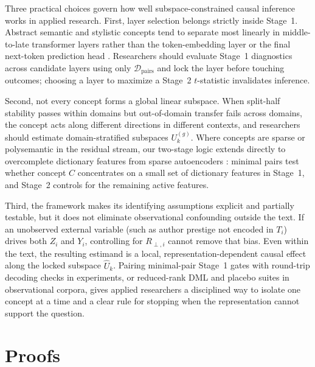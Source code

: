 \documentclass[11pt]{article}
\begin{document}
Three practical choices govern how well subspace-constrained causal inference works in applied research. First, layer selection belongs strictly inside Stage~1. Abstract semantic and stylistic concepts tend to separate most linearly in middle-to-late transformer layers rather than the token-embedding layer or the final next-token prediction head \citep{alain2016understanding,zou2023representation}. Researchers should evaluate Stage~1 diagnostics across candidate layers using only $\mathcal{D}_{\mathrm{pairs}}$ and lock the layer before touching outcomes; choosing a layer to maximize a Stage~2 $t$-statistic invalidates inference.

Second, not every concept forms a global linear subspace. When split-half stability passes within domains but out-of-domain transfer fails across domains, the concept acts along different directions in different contexts, and researchers should estimate domain-stratified subspaces $U_k^{(g)}$. Where concepts are sparse or polysemantic in the residual stream, our two-stage logic extends directly to overcomplete dictionary features from sparse autoencoders \citep{cunningham2023sparse}: minimal pairs test whether concept $C$ concentrates on a small set of dictionary features in Stage~1, and Stage~2 controls for the remaining active features.

Third, the framework makes its identifying assumptions explicit and partially testable, but it does not eliminate observational confounding outside the text. If an unobserved external variable (such as author prestige not encoded in $T_i$) drives both $Z_i$ and $Y_i$, controlling for $R_{\perp, i}$ cannot remove that bias. Even within the text, the resulting estimand is a local, representation-dependent causal effect along the locked subspace $\hat{U}_k$. Pairing minimal-pair Stage~1 gates with round-trip decoding checks in experiments, or reduced-rank DML and placebo suites in observational corpora, gives applied researchers a disciplined way to isolate one concept at a time and a clear rule for stopping when the representation cannot support the question.




\appendix

\section{Proofs}\label{app:proofs}
\end{document}
